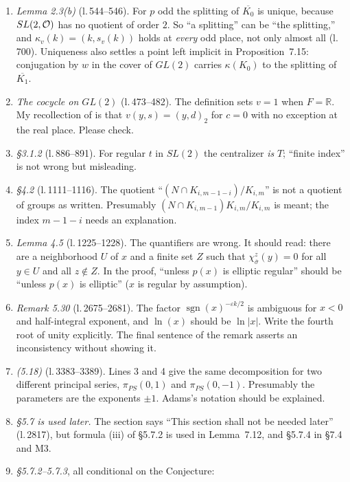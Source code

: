 \documentclass[12pt,letterpaper]{article}
\DeclareMathOperator{\sgn}{sgn}
\newcommand{\R}{\mathbb{R}}
\newcommand{\ov}[1]{\overline{#1}}
\newcommand{\lref}[1]{\textup{(l.\,#1)}}
\theoremstyle{plain}
\begin{document}
\begin{enumerate}
\item \emph{Lemma 2.3(b)} \lref{544--546}. For $p$ odd the splitting of
$\ov{K_0}$ is unique, because $SL(2,{\cal O})$ has no quotient of order
$2$. So ``a splitting'' can be ``the splitting,'' and
$\kappa_v(k)=(k,s_v(k))$ holds at \emph{every} odd place, not only almost
all \lref{700}. Uniqueness also settles a point left implicit in
Proposition~7.15: conjugation by $w$ in the cover of $GL(2)$ carries
$\kappa(K_0)$ to the splitting of $\ov{K_1}$.
\item \emph{The cocycle on $GL(2)$} \lref{473--482}. The definition sets
$v=1$ when $F=\R$. My recollection of \cite[\S2.1]{Ge2} is that
$v(y,s)=(y,d)_2$ for $c=0$ with no exception at the real place. Please
check.
\item \emph{\S3.1.2} \lref{886--891}. For regular $t$ in $SL(2)$ the
centralizer \emph{is} $T$; ``finite index'' is not wrong but misleading.
\item \emph{\S4.2} \lref{1111--1116}. The quotient
``$(N\cap K_{i,m-1-i})/K_{i,m}$'' is not a quotient of groups as written.
Presumably $(N\cap K_{i,m-1})K_{i,m}/K_{i,m}$ is meant; the index
$m-1-i$ needs an explanation.
\item \emph{Lemma 4.5} \lref{1225--1228}. The
quantifiers are wrong. It should read: there are a neighborhood $U$ of $x$
and a finite set $Z$ such that $\chi^z_{\ov\sigma}(y)=0$ for all $y\in U$
and all $z\notin Z$. In the proof, ``unless $p(x)$ is elliptic regular''
should be ``unless $p(x)$ is elliptic'' ($x$ is regular by assumption).
\item \emph{Remark 5.30} \lref{2675--2681}. The factor
$\sgn(x)^{-\varepsilon k/2}$ is ambiguous for $x<0$ and half-integral
exponent, and $\ln(x)$ should be $\ln|x|$. Write the fourth root of unity
explicitly. The final sentence of the remark asserts an inconsistency
without showing it.
\item \emph{(5.18)} \lref{3383--3389}. Lines 3 and 4 give the same
decomposition for two different principal series,
$\pi_{PS}(0,1)$ and $\pi_{PS}(0,-1)$. Presumably the parameters are the
exponents $\pm1$. Adams's notation should be explained.
\item \emph{\S5.7 is used later.} The section says ``This section shall not
be needed later'' \lref{2817}, but formula (iii) of \S5.7.2 is used in
Lemma~7.12, and \S5.7.4 in \S7.4 and M3.
\item \emph{\S5.7.2--5.7.3}, all conditional on the Conjecture:
\begin{itemize}

\end{itemize}
\end{enumerate}
\end{document}

